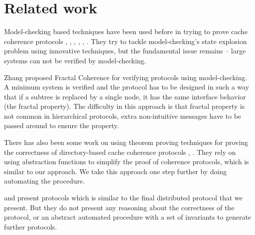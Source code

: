 \section{Related work}
\label{sec:related}

Model-checking based techniques have been used before in trying to prove cache
coherence protocols \cite{Clarke}, \cite{Chou}, \cite{ip}, \cite{McMillan},
\cite{pong}, \cite{Stern}. They try to tackle model-checking's state explosion
problem using innovative techniques, but the fundamental issue remains -- large
systems can not be verified by model-checking.

Zhang \etal proposed Fractal Coherence \cite{Zhang} for verifying protocols
using model-checking. A minimum system is verified and the protocol has to be
designed in such a way that if a subtree is replaced by a single node, it has
the same interface behavior (the fractal property). The difficulty in this
approach is that fractal property is not common in hierarchical protocols, extra
non-intuitive messages have to be passed around to ensure the property.

There has also been some work on using theorem proving techniques for proving
the correctness of directory-based cache coherence protocols \cite{loew},
\cite{park}. They rely on using abstraction functions to simplify the proof of
coherence protocols, which is similar to our approach. We take this approach one
step further by doing automating the procedure.

\cite{Beu} and\cite{edya} present protocols which is similar to the final
distributed protocol that we present. But they do not present any reasoning
about the correctness of the protocol, or an abstract automated procedure with
a set of invariants to generate further protocols.



